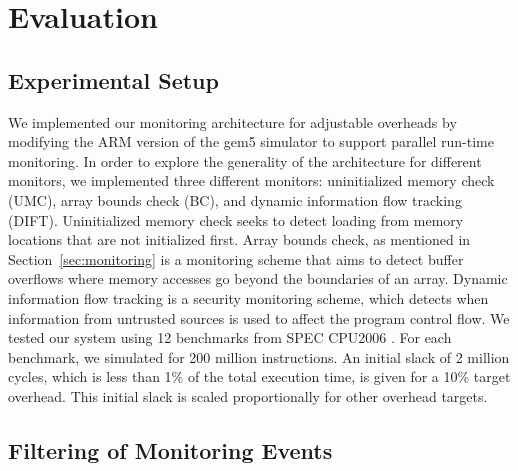\section{Evaluation}
\label{sec:evaluation}

\subsection{Experimental Setup}
\label{sec:evaluation.setup}

We implemented our monitoring architecture for adjustable overheads by
modifying the ARM version of the gem5 simulator \cite{gem5} to support parallel
run-time monitoring. In order to explore the generality of the architecture for
different monitors, we implemented three different monitors: uninitialized
memory check (UMC), array bounds check (BC), and dynamic information flow
tracking (DIFT).  Uninitialized memory check seeks to detect loading from
memory locations that are not initialized first.  Array bounds check, as
mentioned in Section~\ref{sec:monitoring} is a monitoring scheme that aims to
detect buffer overflows where memory accesses go beyond the boundaries of an
array.  Dynamic information flow tracking is a security monitoring scheme,
which detects when information from untrusted sources is used to affect the
program control flow.  We tested our system using 12 benchmarks from SPEC
CPU2006 \cite{spec2006}. For each benchmark, we simulated for 200 million
instructions. An initial slack of 2 million cycles, which is less than 1\% of
the total execution time, is given for a 10\% target overhead. This initial
slack is scaled proportionally for other overhead targets.

\subsection{Filtering of Monitoring Events}

